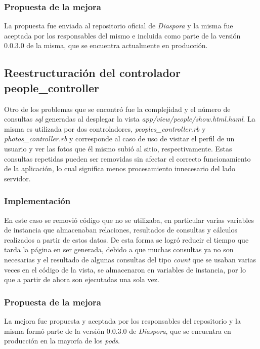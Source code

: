  \subsubsection{Propuesta de la mejora}
 
La propuesta fue enviada al repositorio oficial de \emph{Diaspora} y la misma fue aceptada por los responsables del mismo e incluida como parte de la versión 0.0.3.0 de la misma, que
se encuentra actualmente en producción.
 
\subsection{Reestructuración del controlador people\_controller}

Otro de los problemas que se encontró fue la complejidad y el número de consultas \emph{sql} generadas al desplegar la vista \emph{app/view/people/show.html.haml}.
La misma es utilizada por dos controladores, \emph{peoples\_controller.rb} y \emph{photos\_controller.rb} y corresponde al caso de uso de visitar el perfil de un usuario
y ver las fotos que él mismo subió al sitio, respectivamente. Estas consultas repetidas pueden ser removidas sin afectar el correcto funcionamiento de la aplicación, lo cual significa
menos procesamiento innecesario del lado servidor.

\subsubsection{Implementación}

En este caso se removió código que no se utilizaba, en particular varias variables de instancia que almacenaban relaciones, resultados de consultas y cálculos realizados a partir de
estos datos. De esta forma se logró reducir el tiempo que tarda la página en ser generada, debido a que muchas consultas ya no son necesarias y el resultado de algunas consultas
del tipo \emph{count} que se usaban varias veces en el código de la vista, se almacenaron en variables de instancia, por lo que a partir de ahora son ejecutadas una sola vez.

\subsubsection{Propuesta de la mejora}

La mejora fue propuesta y aceptada por los responsables del repositorio y la misma formó parte de la versión 0.0.3.0 de \emph{Diaspora}, que se encuentra en producción en la mayoría
de los \emph{pods}.

